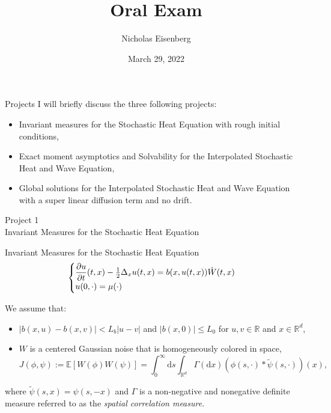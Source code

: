 \documentclass{beamer}%
\title[About Beamer] %
{Oral Exam}
\author[Arthur, Doe] %
{Nicholas Eisenberg}
\date[VLC 2021] %
{ \small March 29, 2022 
}
\numberwithin{equation}{section}
\newcommand{\R}{\mathbb{R}}
\newcommand{\ud}{\ensuremath{\mathrm{d} }}
\begin{document}
	\frame{\titlepage}	
	\setcounter{page}{1}
	\begin{frame}{Projects}
		I will briefly discuss the three following projects: \vspace{.5 in}
			\begin{itemize}
				\item Invariant measures for the Stochastic Heat Equation with rough initial conditions, \vspace{.2in}
				\item Exact moment asymptotics and Solvability for the Interpolated Stochastic Heat and Wave Equation, \vspace{.2in}
				\item Global solutions for the Interpolated Stochastic Heat and Wave Equation with a super linear diffusion term and no drift.
			\end{itemize}
	\end{frame}

	\begin{frame}
		\begin{center}
			Project 1 \\
			Invariant Measures for the Stochastic Heat Equation
		\end{center}
	\end{frame}

	\begin{frame}{Invariant Measures for the Stochastic Heat Equation}
		\[
		\begin{cases}
		\dfrac{\partial u}{\partial t}(t,x)- \frac{1}{2}\Delta_xu(t,x) = b(x, u(t,x))\dot{W}(t,x) &
		\\ u(0,\cdot) = \mu(\cdot)  &
		\end{cases} \vspace{.1in}
		\]

We assume that: \vspace{.1in}
\begin{itemize}
	\item $|b(x,u)-b(x,v)| < L_b|u-v|$ and $|b(x,0)| \le L_0$ for $u,v \in \R$ and $x \in \R^d$, \vspace{.1in}
	\item $W$ is a centered Gaussian noise that is homogeneously colored in space,
		\[
			J(\phi, \psi) := \mathbb{E}\left[W(\phi)W(\psi)\right] = \int_0^\infty \ud s \int_{\R^d} \Gamma(\ud x) (\phi(s,\cdot)*\tilde{\psi}(s,\cdot))(x),
		\]
\end{itemize}
where $\tilde{\psi}(s,x) = \psi(s,-x)$ and $\Gamma$ is a non-negative and nonegative definite measure referred to as the {\it spatial correlation measure}.
\end{frame}
\end{document}
